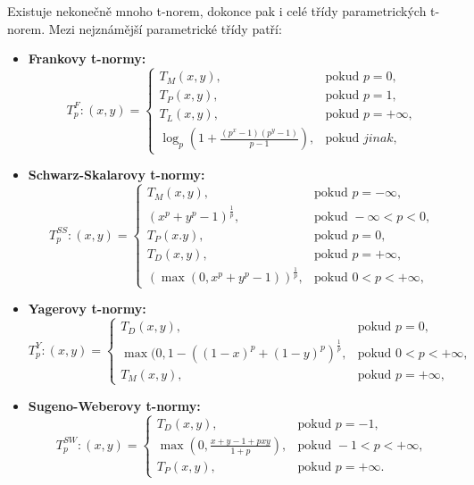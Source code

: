 Existuje nekone\v cn\v e mnoho t-norem, dokonce pak i cel\'e t\v r\'idy parametrick\' ych  t-norem. Mezi nejzn\' am\v ej\v s\' i parametrické třídy patří:
\begin{itemize}
    \item \textbf{Frankovy t-normy:}
    $$T_p^F:(x,y)=\begin{cases} T_M(x,y), & \mbox{pokud }  p = 0,\\ 
                                T_P(x,y), & \mbox{pokud } p = 1,\\
                                T_L(x,y), & \mbox{pokud } p = +\infty,\\
                                \log_p(1+\frac{(p^x-1)(p^y-1)}{p-1}), & \mbox{pokud } jinak, 
                                \end{cases}$$
    \item \textbf{Schwarz-Skalarovy t-normy:}
    $$T_p^{SS}:(x,y)=\begin{cases} T_M(x,y), & \mbox{pokud }  p = -\infty,\\ 
                                (x^p+y^p-1)^\frac{1}{p}, & \mbox{pokud }  -\infty < p < 0,\\ 
                                T_P(x.y), & \mbox{pokud } p = 0,\\
                                T_D(x,y), & \mbox{pokud } p = +\infty,\\
                                (\max(0, x^p+y^p-1))^\frac{1}{p}, & \mbox{pokud } 0 < p < +\infty, \end{cases}$$
    \item \textbf{Yagerovy t-normy:}
    $$T_p^Y:(x,y)=\begin{cases}  T_D(x,y), & \mbox{pokud } p = 0,\\
                                \max(0,1-((1-x)^p+(1-y)^p)^\frac{1}{p} , & \mbox{pokud } 0 < p < +\infty,\\
                                T_M(x,y), & \mbox{pokud } p = +\infty,
                                \end{cases}$$
    \item \textbf{Sugeno-Weberovy t-normy:}
    $$T_p^{SW}:(x,y)=\begin{cases}  T_D(x,y), & \mbox{pokud } p = -1,\\
                                    \max(0,\frac{x+y-1+pxy}{1+p}) , & \mbox{pokud } -1 < p < +\infty,\\
                                    T_P(x,y), & \mbox{pokud } p = +\infty.
                                    \end{cases}$$
\end{itemize}

